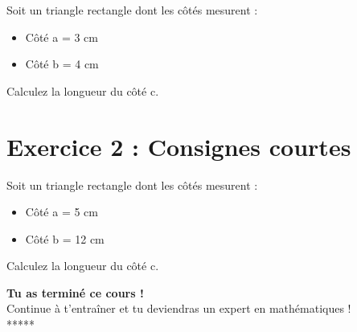 \documentclass[12pt,a4paper]{article}
\begin{document}
Soit un triangle rectangle dont les côtés mesurent :
\begin{itemize}
    \item Côté a = 3 cm
    \item Côté b = 4 cm
\end{itemize}
Calculez la longueur du côté c.

\section*{Exercice 2 : Consignes courtes}

Soit un triangle rectangle dont les côtés mesurent :
\begin{itemize}
    \item Côté a = 5 cm
    \item Côté b = 12 cm
\end{itemize}
Calculez la longueur du côté c.

\newpage
\begin{center}
\begin{tcolorbox}[colback=lightgray,colframe=success,title=\textbf{\textcolor{success}{Bravo !}}]
\Large\textbf{\textcolor{success}{Tu as terminé ce cours !}}\\[0.5cm]
\textcolor{secondary}{Continue à t'entraîner et tu deviendras un expert en mathématiques !}\\[0.5cm]
\textcolor{accent}{*****}
\end{tcolorbox}
\end{center}
\end{document}
